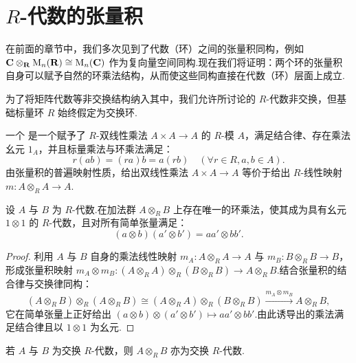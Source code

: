 \section{\texorpdfstring{$R$}{R}-代数的张量积}
\label{sec:algebras}

在前面的章节中，我们多次见到了代数（环）之间的张量积同构，例如 $\mathbf{C} \otimes_{\mathbf{R}} \mathrm{M}_n(\mathbf{R}) \cong \mathrm{M}_n(\mathbf{C})$ 作为复向量空间同构.现在我们将证明：两个环的张量积自身可以赋予自然的环乘法结构，从而使这些同构直接在代数（环）层面上成立.

为了将矩阵代数等非交换结构纳入其中，我们允许所讨论的 $R$-代数非交换，但基础标量环 $R$ 始终假定为交换环.

一个  是一个赋予了 $R$-双线性乘法 $A \times A \to A$ 的 $R$-模 $A$，满足结合律、存在乘法幺元 $1_A$，并且标量乘法与环乘法满足：
\begin{equation}
  r(ab) = (ra)b = a(rb) \quad (\forall r \in R, a, b \in A). \label{eq:7.1}
\end{equation}
由张量积的普遍映射性质，给出双线性乘法 $A \times A \to A$ 等价于给出 $R$-线性映射 $m \colon A \otimes_R A \to A$.

\begin{theorem}[代数张量积的乘法结构]\label{thm:algebra-tensor-mult}
设 $A$ 与 $B$ 为 $R$-代数.在加法群 $A \otimes_R B$ 上存在唯一的环乘法，使其成为具有幺元 $1 \otimes 1$ 的 $R$-代数，且对所有简单张量满足：
\begin{equation}
  (a \otimes b)(a' \otimes b') = aa' \otimes bb'. \label{eq:7.2}
\end{equation}
\end{theorem}

\begin{proof}
利用 $A$ 与 $B$ 自身的乘法线性映射 $m_A \colon A \otimes_R A \to A$ 与 $m_B \colon B \otimes_R B \to B$，形成张量积映射 $m_A \otimes m_B \colon (A \otimes_R A) \otimes_R (B \otimes_R B) \to A \otimes_R B$.结合张量积的结合律与交换律同构：
\[
  (A \otimes_R B) \otimes_R (A \otimes_R B) \cong (A \otimes_R A) \otimes_R (B \otimes_R B) \xrightarrow{m_A \otimes m_B} A \otimes_R B,
\]
它在简单张量上正好给出 $(a \otimes b) \otimes (a' \otimes b') \mapsto aa' \otimes bb'$.由此诱导出的乘法满足结合律且以 $1 \otimes 1$ 为幺元.
\end{proof}

\begin{corollary}\label{cor:comm-algebras-tensor}
若 $A$ 与 $B$ 为交换 $R$-代数，则 $A \otimes_R B$ 亦为交换 $R$-代数.
\end{corollary}


